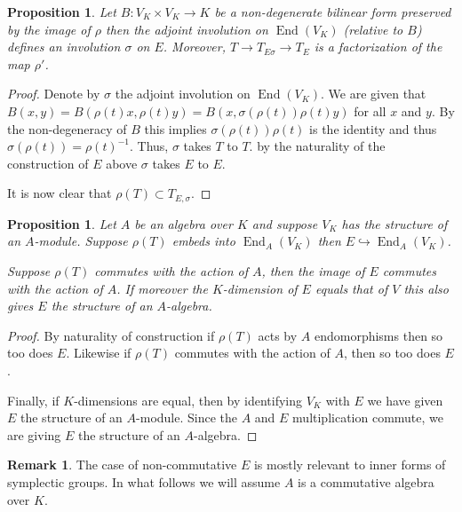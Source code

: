 \documentclass{article}
\theoremstyle{plain}
\newtheorem{proposition}[theorem]{Proposition}
\theoremstyle{definition}
\newtheorem{remark}[theorem]{Remark}
\DeclareMathOperator{\End}{End}
\begin{document}
\begin{proposition}
Let $B : V_K \times V_K \rightarrow K$ be a non-degenerate bilinear form preserved by the image of $\rho$ then the adjoint involution on $\End(V_K)$ (relative to $B$) defines an involution $\sigma$ on $E$.
Moreover, $T \rightarrow T_{E\sigma} \rightarrow T_E$ is a factorization of the map $\rho'$.
\end{proposition}
\begin{proof}
Denote by $\sigma$ the adjoint involution on $\End(V_K)$.
We are given that $B(x,y) = B(\rho(t)x,\rho(t)y) = B(x,\sigma(\rho(t))\rho(t)y)$ for all $x$ and $y$. By the non-degeneracy of $B$ this implies $\sigma(\rho(t))\rho(t)$ is the identity and thus $\sigma(\rho(t)) = \rho(t)^{-1}$. Thus, $\sigma$ takes $T$ to $T$. by the naturality of the construction of $E$ above $\sigma$ takes $E$ to $E$.

It is now clear that $\rho(T) \subset T_{E,\sigma}$.
\end{proof}



\begin{proposition}
Let $A$ be an algebra over $K$ and suppose $V_K$ has the structure of an $A$-module.
Suppose $\rho(T)$ embeds into $\End_A(V_K)$ then $E\hookrightarrow \End_A(V_K)$.

Suppose $\rho(T)$ commutes with the action of $A$, then the image of $E$ commutes with the action of $A$.
If moreover the $K$-dimension of $E$ equals that of $V$ this also gives $E$ the structure of an $A$-algebra.
\end{proposition}
\begin{proof}
By naturality of construction if $\rho(T)$ acts by $A$ endomorphisms then so too does $E$.
Likewise if $\rho(T)$ commutes with the action of $A$, then so too does $E$.

Finally, if $K$-dimensions are equal, then by identifying $V_K$ with $E$ we have given $E$ the structure of an $A$-module. Since the $A$ and $E$ multiplication commute, we are giving $E$ the structure of an $A$-algebra.
\end{proof}
\begin{remark}
The case of non-commutative $E$ is mostly relevant to inner forms of symplectic groups.
In what follows we will assume $A$ is a commutative algebra over $K$.
\end{remark}
\end{document}
